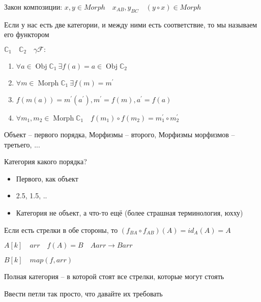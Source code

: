 \documentclass{book}
\DeclareMathOperator{\Obj}{Obj}
\DeclareMathOperator{\Morph}{Morph}
\renewcommand\C{\ensuremath{\mathbb{C}}}
\newcommand{\p}[1]{#1^{\prime}}
\theoremstyle{definition}
\begin{document}
    Закон композиции: $x, y\in Morph\quad x_{AB}, y_{BC}\quad (y\circ x)\in Morph$

    Если у нас есть две категории, и между ними есть соответствие, то мы называем его функтором

    $\C_1\quad \C_2\quad \gamma\mathscr{F}:$
    \begin{enumerate}
        \item $\forall a\in \Obj \C_1\ \exists f(a) = a\in \Obj \C_2$
        \item $\forall m\in \Morph \C_1\ \exists  f(m) = \p m$
        \item $f\left( m\left( a \right)  \right)  = \p m\left( \p a \right) , \p m = f(m), \p a = f(a)$
        \item $\forall m_1, m_2\in \Morph \C_1\quad f\left( m_1 \right) \circ f\left(m_2 \right) = \p m_1\circ \p m_2$
    \end{enumerate}
    Объект -- первого порядка, Морфизмы -- второго, Морфизмы морфизмов -- третьего, ...

    Категория какого порядка?
    \begin{itemize}
        \item  Первого, как объект
        \item 2.5, 1.5, ..
        \item Категория не объект, а что-то ещё (более страшная терминология, юхху)
    \end{itemize}

    Если есть стрелки в обе стороны, то $(f_{BA}\circ f_{AB} )(A) = id_A(A) = A$

    $A[k]\quad arr\quad f(A) = B\quad Aarr \to Barr$

    $B[k]\quad map(f, arr)$

    \begin{definition}
        Полная категория -- в которой стоят все стрелки, которые могут стоять
    \end{definition}

    Ввести петли так просто, что давайте их требовать
\end{document}
